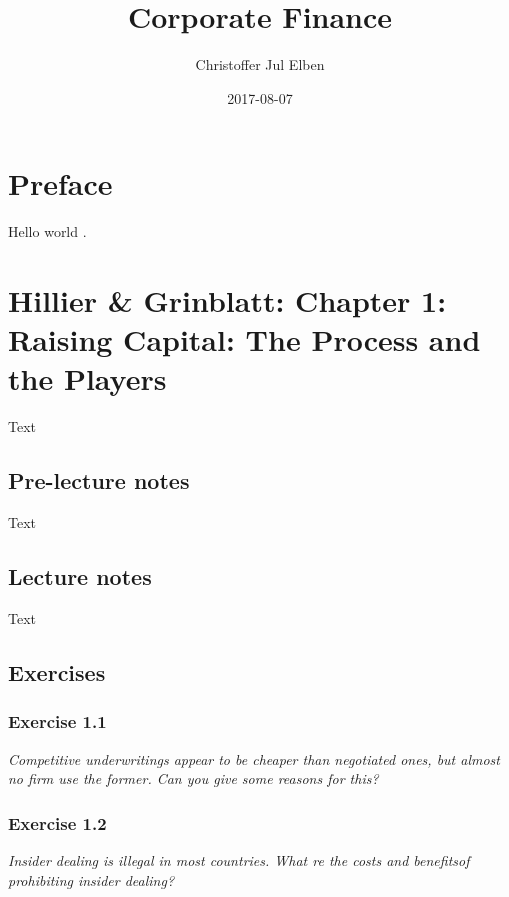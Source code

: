 \documentclass[]{book}
\title{Corporate Finance}
\author{Christoffer Jul Elben}
\date{2017-08-07}
\theoremstyle{definition}
\theoremstyle{definition}
\theoremstyle{remark}
\begin{document}
\maketitle

{
\setcounter{tocdepth}{1}
\tableofcontents
}
\chapter{Preface}\label{preface}

Hello world \citep{book}.

\chapter{Hillier \& Grinblatt: Chapter 1: Raising Capital: The Process
and the
Players}\label{hillier-grinblatt-chapter-1-raising-capital-the-process-and-the-players}

Text

\section{Pre-lecture notes}\label{pre-lecture-notes}

Text

\section{Lecture notes}\label{lecture-notes}

Text

\section{Exercises}\label{exercises}

\subsection{Exercise 1.1}\label{exercise-1.1}

\emph{Competitive underwritings appear to be cheaper than negotiated
ones, but almost no firm use the former. Can you give some reasons for
this?} \citep[p.26]{book}

\subsection{Exercise 1.2}\label{exercise-1.2}

\emph{Insider dealing is illegal in most countries. What re the costs
and benefitsof prohibiting insider dealing?} \citep[p.26]{book}
\end{document}
